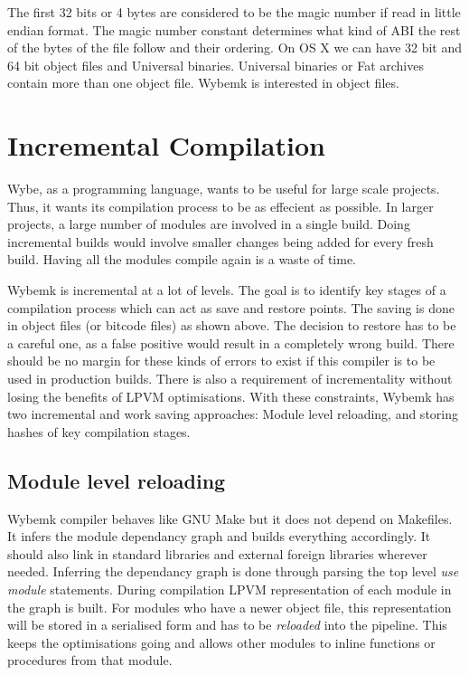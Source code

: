 The first 32 bits or 4 bytes are considered to be the magic number if read in
little endian format. The magic number constant determines what kind of ABI the
rest of the bytes of the file follow and their ordering. On OS X we can have 32
bit and 64 bit \macho object files and Universal binaries. Universal binaries
or Fat archives contain more than one object file. Wybemk is interested in
\macho object files.


\section{Incremental Compilation}

Wybe, as a programming language, wants to be useful for large scale
projects. Thus, it wants its compilation process to be as effecient as
possible. In larger projects, a large number of modules are involved in a
single build. Doing incremental builds would involve smaller changes being
added for every fresh build. Having all the modules compile again is a waste of
time. 

Wybemk is incremental at a lot of levels. The goal is to identify key stages of
a compilation process which can act as save and restore points. The saving is
done in object files (or bitcode files) as shown above. The decision to restore
has to be a careful one, as a false positive would result in a completely wrong
build. There should be no margin for these kinds of errors to exist if this
compiler is to be used in production builds. There is also a requirement of
incrementality without losing the benefits of LPVM optimisations. With these
constraints, Wybemk has two incremental and work saving approaches: Module
level reloading, and storing hashes of key compilation stages. 


\subsection{Module level reloading}

Wybemk compiler behaves like GNU Make but it does not depend on Makefiles. It
infers the module dependancy graph and builds everything accordingly. It should
also link in standard libraries and external foreign libraries wherever
needed. Inferring the dependancy graph is done through parsing the top level
\textit{use module} statements. During compilation LPVM representation of each
module in the graph is built. For modules who have a newer object file, this
representation will be stored in a serialised form and has to be
\textit{reloaded} into the pipeline. This keeps the optimisations going and
allows other modules to inline functions or procedures from that module.

